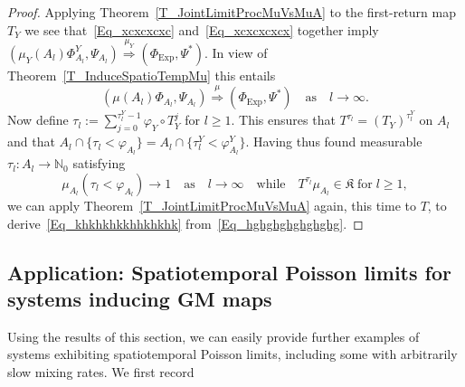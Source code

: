 \documentclass[10pt]{amsart}
\theoremstyle{definition}\newtheorem{defi}[theo]{Definition}\newtheorem{rema}[theo]{Remark}\newtheorem{exam}[theo]{Example}\newtheorem{exem}[theo]{Example}\newtheorem{nota}[theo]{Notation}
\newcommand{\Expl}{\mathrm{Exp}}
\newcommand{\frkK}{\mathfrak{K}}
\newcommand{\bbN}{\mathbb{N}}
\begin{document}
\begin{proof}
Applying Theorem~\ref{T_JointLimitProcMuVsMuA} to the first-return map $T_{Y} $ we see that~\eqref{Eq_xcxcxcxc} and~\eqref{Eq_xcxcxcxcx} together imply $(\mu_{Y}(A_{l})\Phi_{A_{l}}^{Y},\Psi_{A_{l}})\overset{\mu_{Y}} {\Longrightarrow}(\Phi_{\Expl},\Psi^{\ast})$. In view of Theorem~\ref{T_InduceSpatioTempMu} this entails
\begin{equation}\label{Eq_hghghghghghghg}
\left(\mu(A_{l})\Phi_{A_{l}},\Psi_{A_{l}}\right)\overset{\mu}{\Longrightarrow} \left(\Phi_{\Expl},\Psi^{\ast}\right)\quad\text{as}\quad l\rightarrow\infty.
\end{equation}
Now define $\tau_{l}:=\sum_{j=0}^{\tau_{l}^{Y}-1}\varphi_{Y}\circ T_{Y}^{j}$ for $l\geq1$. This ensures that $T^{\tau_{l}}=(T_{Y})^{\tau_{l}^{Y}}$ on $A_{l}$ and that $A_{l}\cap\{\tau_{l}<\varphi_{A_{l}}\}=A_{l}\cap\{\tau _{l}^{Y}<\varphi_{A_{l}}^{Y}\}$. Having thus found measurable $\tau_{l} :A_{l}\rightarrow\bbN_{0}$ satisfying
\[
\mu_{A_{l}}\left(\tau_{l}<\varphi_{A_{l}}\right) \longrightarrow1\quad\text{as}\quad l\rightarrow\infty\quad\text{while}\quad T^{\tau_{l}}\mu_{A_{l}}
\in\frkK\;\text{for}\;l\geq1,
\]
we can apply Theorem~\ref{T_JointLimitProcMuVsMuA} again, this time to $T$, to derive~\eqref{Eq_khkhkhkkhhkhkhk} from~\eqref{Eq_hghghghghghghg}.
\end{proof}

\subsection{Application: Spatiotemporal Poisson limits for systems inducing GM maps}
Using the results of this section, we can easily provide further examples of systems exhibiting spatiotemporal Poisson limits, including some with arbitrarily slow mixing rates. We first record
\end{document}

